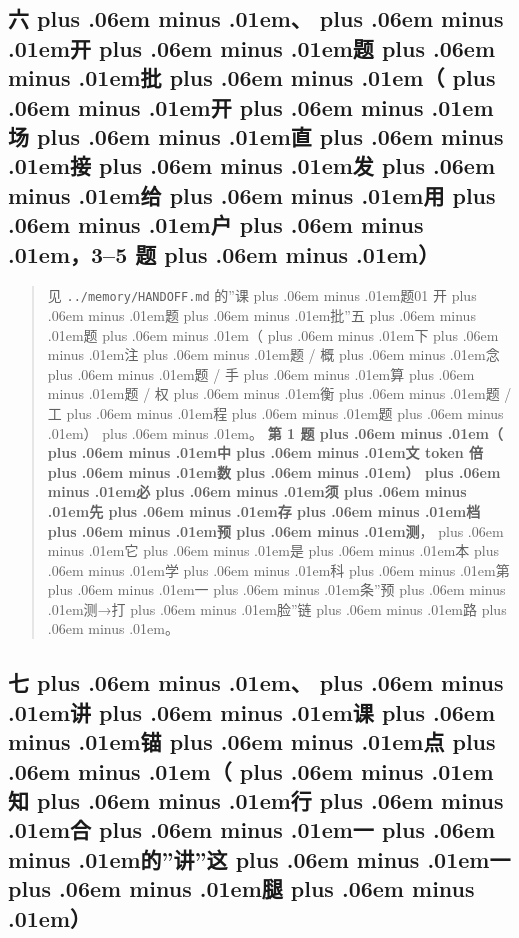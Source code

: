 \documentclass[
]{article}
\newcommand{\passthrough}[1]{#1}
\def\zh#1{{\zhfont #1}}
\def\sym#1{{\symfont #1}}
\def\zhglue{\hskip0pt plus .06em minus .01em}
\begin{document}
\subsection{\zh{六\zhglue 、\zhglue 开\zhglue 题\zhglue 批\zhglue （\zhglue 开\zhglue 场\zhglue 直\zhglue 接\zhglue 发\zhglue 给\zhglue 用\zhglue 户\zhglue ，}3--5 \zh{题\zhglue ）}}\label{ux516dux5f00ux9898ux6279ux5f00ux573aux76f4ux63a5ux53d1ux7ed9ux7528ux623735-ux9898}

\begin{quote}
\zh{见} \passthrough{\lstinline!../memory/HANDOFF.md!} \zh{的}''\zh{课\zhglue 题}01 \zh{开\zhglue 题\zhglue 批}''\zh{五\zhglue 题\zhglue （\zhglue 下\zhglue 注\zhglue 题} / \zh{概\zhglue 念\zhglue 题} / \zh{手\zhglue 算\zhglue 题} / \zh{权\zhglue 衡\zhglue 题} / \zh{工\zhglue 程\zhglue 题\zhglue ）\zhglue 。} \textbf{\zh{第} 1 \zh{题\zhglue （\zhglue 中\zhglue 文} token \zh{倍\zhglue 数\zhglue ）\zhglue 必\zhglue 须\zhglue 先\zhglue 存\zhglue 档\zhglue 预\zhglue 测}}\zh{，\zhglue 它\zhglue 是\zhglue 本\zhglue 学\zhglue 科\zhglue 第\zhglue 一\zhglue 条}''\zh{预\zhglue 测}\sym{→}\zh{打\zhglue 脸}''\zh{链\zhglue 路\zhglue 。}
\end{quote}

\subsection{\zh{七\zhglue 、\zhglue 讲\zhglue 课\zhglue 锚\zhglue 点\zhglue （\zhglue 知\zhglue 行\zhglue 合\zhglue 一\zhglue 的}''\zh{讲}''\zh{这\zhglue 一\zhglue 腿\zhglue ）}}\label{ux4e03ux8bb2ux8bfeux951aux70b9ux77e5ux884cux5408ux4e00ux7684ux8bb2ux8fd9ux4e00ux817f}
\end{document}
